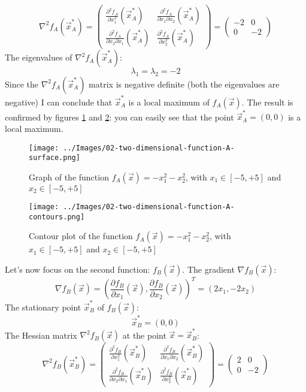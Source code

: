     \[
        \nabla^2 f_A(\vec{x}_A^*) =
        \begin{pmatrix}
            \frac{\partial^2 f_A}{\partial x_1^2}(\vec{x}^*_A) &
            \frac{\partial^2 f_A}{\partial x_1 \partial x_2}(\vec{x}^*_A) \\
            \frac{\partial^2 f_A}{\partial x_2 \partial x_1}(\vec{x}^*_A) &
            \frac{\partial^2 f_A}{\partial x_2^2}(\vec{x}^*_A)
        \end{pmatrix}
        =
        \begin{pmatrix}
            -2 & 0 \\
            0 & -2
        \end{pmatrix}
    \]
    The eigenvalues of \(\nabla^2 f_A(\vec{x}^*_A)\):
    \[\lambda_1 = \lambda_2 = -2\]
    Since the \(\nabla^2 f_A(\vec{x}_A^*)\) matrix is negative definite (both the eigenvalues are negative) I can conclude that \(\vec{x}^*_A\) is a local maximum of \(f_A(\vec{x})\). The result is confirmed by figures \ref{two-dimensional-function-A-surface} and \ref{two-dimensional-function-A-contours}: you can easily see that the point \(\vec{x}_A^* = (0, 0)\) is a local maximum.\par
    \begin{figure}
        \centering
        \texttt{[image: ../Images/02-two-dimensional-function-A-surface.png]}
        \caption{Graph of the function \(f_A(\vec{x}) = - x_{1}^{2} - x_{2}^{2}\), with \(x_1 \in [-5, +5]\) and \(x_2 \in [-5, +5]\)}
        \label{two-dimensional-function-A-surface}
    \end{figure}
    \begin{figure}
        \centering
        \texttt{[image: ../Images/02-two-dimensional-function-A-contours.png]}
        \caption{Contour plot of the function \(f_A(\vec{x}) = - x_{1}^{2} - x_{2}^{2}\), with \(x_1 \in [-5, +5]\) and \(x_2 \in [-5, +5]\)}
        \label{two-dimensional-function-A-contours}
    \end{figure}
    Let's now focus on the second function: \(f_B(\vec{x})\). The gradient \(\nabla f_B(\vec{x})\):
    \[\nabla f_B(\vec{x}) = \left (\frac{\partial f_B}{\partial x_1}(\vec{x}), \frac{\partial f_B}{\partial x_2}(\vec{x}) \right )^T = (2x_1, -2x_2)\]
    The stationary point \(\vec{x}_B^*\) of \(f_B(\vec{x})\):
    \[\vec{x}_B^* = (0, 0)\]
    The Hessian matrix \(\nabla^2 f_B(\vec{x})\) at the point \(\vec{x} = \vec{x}_B^*\):
    \[
        \nabla^2 f_B(\vec{x}_B^*) =
        \begin{pmatrix}
            \frac{\partial^2 f_B}{\partial x_1^2}(\vec{x}^*_B) &
            \frac{\partial^2 f_B}{\partial x_1 \partial x_2}(\vec{x}^*_B) \\
            \frac{\partial^2 f_B}{\partial x_2 \partial x_1}(\vec{x}^*_B) &
            \frac{\partial^2 f_B}{\partial x_2^2}(\vec{x}^*_B)
        \end{pmatrix}
        =
        \begin{pmatrix}
            2 & 0 \\
            0 & -2
        \end{pmatrix}
    \]
